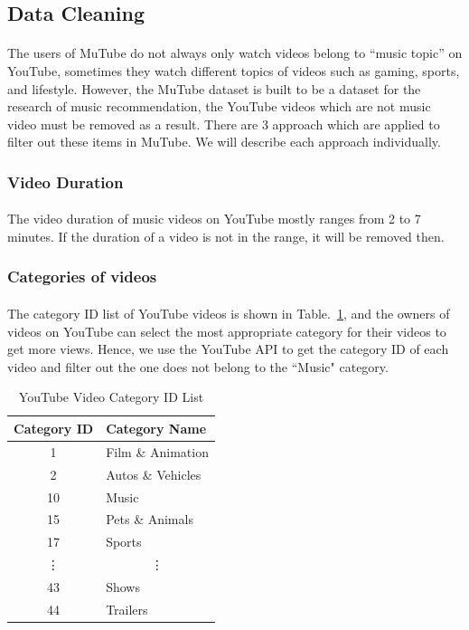 \documentclass[a4paper,12pt]{report}
\begin{document}
\subsection{Data Cleaning}
\paragraph{}
The users of MuTube do not always only watch videos belong to ``music topic'' on YouTube, sometimes they watch different topics of videos such as gaming, sports, and lifestyle. However, the MuTube dataset is built to be a dataset for the research of music recommendation, the YouTube videos which are not music video must be removed as a result. There are 3 approach which are applied to filter out these items in MuTube. We will describe each approach individually.
\subsubsection{Video Duration}
\paragraph{}
The video duration of music videos on YouTube mostly ranges from 2 to 7 minutes. If the duration of a video is not in the range, it will be removed then.

\subsubsection{Categories of videos}
\paragraph{}
The category ID list of YouTube videos is shown in Table.~\ref{tab:MuTube_category_id}, and the owners of videos on YouTube can select the most appropriate category for their videos to get more views. Hence, we use the YouTube API to get the category ID of each video and filter out the one does not belong to the ``Music" category.
\begin{table}[!ht]
    \centering
    \caption{YouTube Video Category ID List}
    \begin{tabular}{|c|l|}
    \hline
    Category ID     &  Category Name \\
    \hline
    1     & Film \& Animation \\
    2     & Autos \& Vehicles \\
    10    & Music \\
    15    & Pets \& Animals \\
    17    & Sports \\
    \vdots     & \multicolumn{1}{c|}{\vdots} \\
    43    & Shows \\
    44    & Trailers \\
    \hline
    \end{tabular}
    \label{tab:MuTube_category_id}
\end{table}
\end{document}
